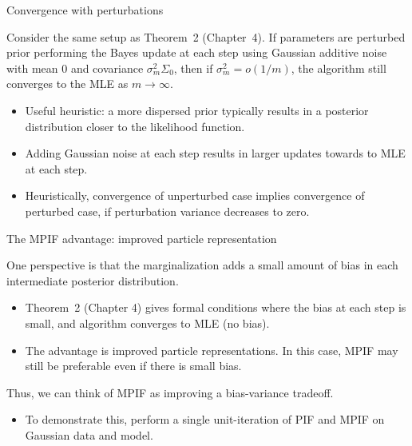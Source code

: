 \documentclass[aspectratio=169]{beamer}\usepackage[]{graphicx}\usepackage[]{xcolor}
\begin{document}
\begin{frame}{Convergence with perturbations}

    \begin{theorem}
    Consider the same setup as Theorem~2 (Chapter~4). If parameters are perturbed prior performing the Bayes update at each step using Gaussian additive noise with mean $0$ and covariance $\sigma^2_m\Sigma_0$, then if $\sigma_m^2 = o(1/m)$, the algorithm still converges to the MLE as $m\rightarrow \infty$. 
  \end{theorem}
  
  \begin{itemize}
    \item Useful heuristic: a more dispersed prior typically results in a posterior distribution closer to the likelihood function.
    \item Adding Gaussian noise at each step results in larger updates towards to MLE at each step.
    \item Heuristically, convergence of unperturbed case implies convergence of perturbed case, if perturbation variance decreases to zero.
  \end{itemize}

\end{frame}

\begin{frame}{The MPIF advantage: improved particle representation}

  One perspective is that the marginalization adds a small amount of bias in each intermediate posterior distribution.
  
  \begin{itemize}
    \item Theorem~2 (Chapter 4) gives formal conditions where the bias at each step is small, and algorithm converges to MLE (no bias).
    \item The advantage is improved particle representations. In this case, MPIF may still be preferable even if there is small bias.
  \end{itemize}
  
  Thus, we can think of MPIF as improving a bias-variance tradeoff.
  
  \begin{itemize}
    \item To demonstrate this, perform a single unit-iteration of PIF and MPIF on Gaussian data and model.
  \end{itemize}
  
\end{frame}
\end{document}
